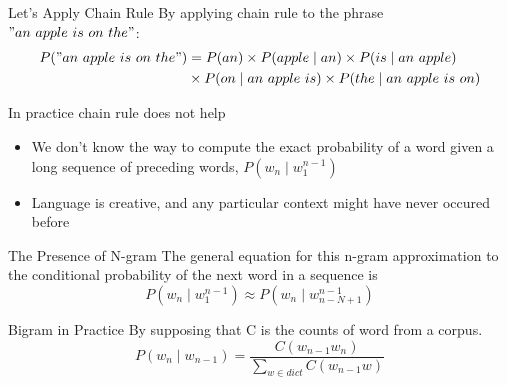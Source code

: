 \documentclass{beamer}
\begin{document}
\begin{frame}{Let's Apply Chain Rule}
By applying chain rule to the phrase $"an\ apple\ is\ on\ the"$:
    \begin{align*}
        P("an\ apple\ is\ on\ the") &= P(an)\times P(apple\mid an) \times P(is\mid an\ apple)\\
                                  &\times P(on\mid an\ apple\ is) \times P(the\mid an\ apple\ is\ on) 
    \end{align*}
\end{frame}

\begin{frame}{In practice chain rule does not help}
    \begin{itemize}[<+->]
        \item We don't know the way to compute the exact probability of a word given a long sequence of preceding words, $P(w_n\mid w_1^{n-1})$
        \item Language is creative, and any particular context might have never occured before
    \end{itemize}
\end{frame}

\begin{frame}{The Presence of N-gram}
    The general equation for this n-gram approximation to the conditional probability of the next word in a sequence is
    $$P(w_n\mid w_1^{n-1}) \approx P(w_n\mid w_{n-N+1}^{n-1})$$


\end{frame}


\begin{frame}{Bigram in Practice}
By supposing that C is the counts of word from a corpus.
    $$P(w_n\mid w_{n-1}) = \frac{C(w_{n-1}w_n)}{\sum_{w\in dict}C(w_{n-1}w)}$$

\end{frame}
\end{document}
